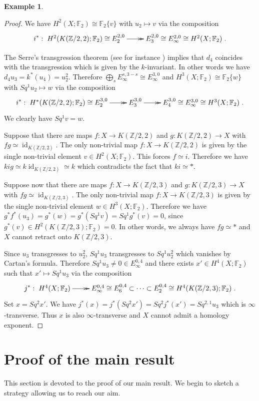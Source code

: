 \documentclass{conm-p-l}
\theoremstyle{definition}
\newtheorem{exmp}[thm]{Example}
\DeclareMathOperator{\id}{id}
\newcommand{\Z}{\mathbb{Z}}
\newcommand{\F}{\mathbb{F}}
\begin{document}
\begin{exmp}
\begin{proof}
We have $H^2(X;\F_2)\cong\F_2\{v\}$ with $u_2\mapsto v$ via the composition
$$
i^*:\xymatrix{H^2(K(\Z/2,2);\F_2)\cong E^{2,0}_2\ar@{->>}[r] &E^{2,0}_3\cong E^{2,0}_\infty\cong H^2(X;\F_2)}.
$$ 

The Serre's transgression theorem (see for instance \cite[Theorem 6.8, p. 189]{Mc00}) implies that $d_4$ coincides with the transgression which is given by the $k$-invariant. In other words we have $d_4u_3=k^*(u_4)=u_2^2$. Therefore $\bigoplus_{s}E_\infty^{s,3-s}\cong E_\infty^{3,0}$ and $H^3(X;\F_2)\cong\F_2\{w\}$ with $Sq^1u_2\mapsto w$ via the composition
$$
i^*:\xymatrix{H^*(K(\Z/2,2);\F_2)\cong E_2^{3,0}\ar@{->>}[r] &E_3^{3,0}\ar@{->>}[r] &E_4^{3,0}\cong E_\infty^{3,0}\cong H^3(X;\F_2)}.
$$ 
We clearly have $Sq^1v=w$.

Suppose that there are maps $f:X\to K(\Z/2,2)$ and $g:K(\Z/2,2)\to X$ with $fg\simeq \id_{K(\Z/2,2)}$. The only non-trivial map $f:X\to K(\Z/2,2)$ is given by the single non-trivial element $v\in H^2(X;\F_2)$. This forces $f\simeq i$. Therefore we have $kig\simeq k\id_{K(\Z/2,2)}\simeq k$ which contradicts the fact that $ki\simeq *$.

Suppose now that there are maps $f:X\to K(\Z/2,3)$ and $g:K(\Z/2,3)\to X$ with $fg\simeq \id_{K(\Z/2,3)}$. The only non-trivial map $f:X\to K(\Z/2,3)$ is given by the single non-trivial element $w\in H^3(X;\F_2)$. Therefore we have $g^*f^*(u_3)=g^*(w)=g^*(Sq^1v)=Sq^1g^*(v)=0$, since $g^*(v)\in H^2(K(\Z/2,3);\F_2)=0$. In other words, we always have $fg\simeq*$ and $X$ cannot retract onto $K(\Z/2,3)$.

Since $u_3$ transgresses to $u_2^2$, $Sq^1u_3$ transgresses to $Sq^1u_2^2$ which vanishes by Cartan's formula. Therefore $Sq^1u_3\not=0\in E_\infty^{0,4}$ and there exists $x'\in H^4(X;\F_2)$ such that $x'\mapsto Sq^1u_3$ via the composition
$$
j^*:\xymatrix{H^4(X;\F_2)\ar@{->>}[r] &E^{0,4}_\infty\cong E^{0,4}_6\subset\dots\subset E^{0,4}_2\cong H^4(K(\Z/2,3);\F_2)}.
$$ Set $x=Sq^2x'$. We have $j^*(x)=j^*(Sq^2x')=Sq^2j^*(x')=Sq^{2,1}u_3$ which is $\infty$-transverse. Thus $x$ is also $\infty$-transverse and $X$ cannot admit a homology exponent. 
\end{proof}
\end{exmp}

\section{Proof of the main result}\label{s:proofs}

This section is devoted to the proof of our main result. We begin to sketch a strategy allowing us to reach our aim.
\end{document}
